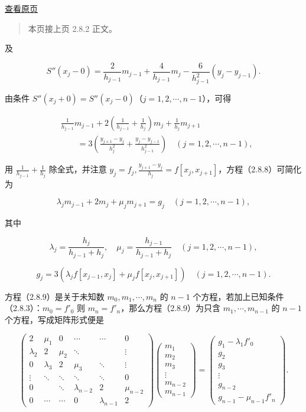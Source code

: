 \documentclass[
  10pt,
  fontset=fandol]{ctexart}
\begin{document}
\href{../../source-images/pdf-051.jpeg}{查看原页}

\begin{quote}
本页接上页 2.8.2 正文。
\end{quote}

及

\[S''(x_j-0)=\frac2{h_{j-1}}m_{j-1}+\frac4{h_{j-1}}m_j-\frac6{h_{j-1}^2}(y_j-y_{j-1}).\]

由条件 \(S''(x_j+0)=S''(x_j-0)\)（\(j=1,2,\cdots,n-1\)），可得

\[\begin{aligned}
&\frac1{h_{j-1}}m_{j-1}+2\left(\frac1{h_{j-1}}+\frac1{h_j}\right)m_j+\frac1{h_j}m_{j+1}\\
&\qquad=3\left(\frac{y_{j+1}-y_j}{h_j^2}+\frac{y_j-y_{j-1}}{h_{j-1}^2}\right)\quad(j=1,2,\cdots,n-1),
\end{aligned}\tag{2.8.8}\]

用 \(\frac1{h_{j-1}}+\frac1{h_j}\) 除全式，并注意 \(y_j=f_j,\frac{y_{j+1}-y_j}{h_j}=f[x_j,x_{j+1}]\)，方程（2.8.8）可简化为

\[\lambda_jm_{j-1}+2m_j+\mu_jm_{j+1}=g_j\quad(j=1,2,\cdots,n-1),\tag{2.8.9}\]

其中

\[\lambda_j=\frac{h_j}{h_{j-1}+h_j},\quad\mu_j=\frac{h_{j-1}}{h_{j-1}+h_j}\quad(j=1,2,\cdots,n-1),\tag{2.8.10}\]

\[g_j=3(\lambda_jf[x_{j-1},x_j]+\mu_jf[x_j,x_{j+1}])\quad(j=1,2,\cdots,n-1).\tag{2.8.11}\]

方程（2.8.9）是关于未知数 \(m_0,m_1,\cdots,m_n\) 的 \(n-1\) 个方程，若加上已知条件（2.8.3）：\(m_0=f'_0\) 则 \(m_n=f'_n\)，那么方程（2.8.9）为只含 \(m_1,\cdots,m_{n-1}\) 的 \(n-1\) 个方程，写成矩阵形式便是

\[\begin{pmatrix}
2&\mu_1&0&\cdots&\cdots&0\\
\lambda_2&2&\mu_2&\ddots&&\vdots\\
0&\lambda_3&2&\mu_3&\ddots&\vdots\\
\vdots&\ddots&\ddots&\ddots&\ddots&0\\
0&&\ddots&\lambda_{n-2}&2&\mu_{n-2}\\
0&\cdots&\cdots&0&\lambda_{n-1}&2
\end{pmatrix}
\begin{pmatrix}m_1\\m_2\\m_3\\\vdots\\m_{n-2}\\m_{n-1}\end{pmatrix}
=\begin{pmatrix}g_1-\lambda_1f'_0\\g_2\\g_3\\\vdots\\g_{n-2}\\g_{n-1}-\mu_{n-1}f'_n\end{pmatrix}.\tag{2.8.12}\]
\end{document}
